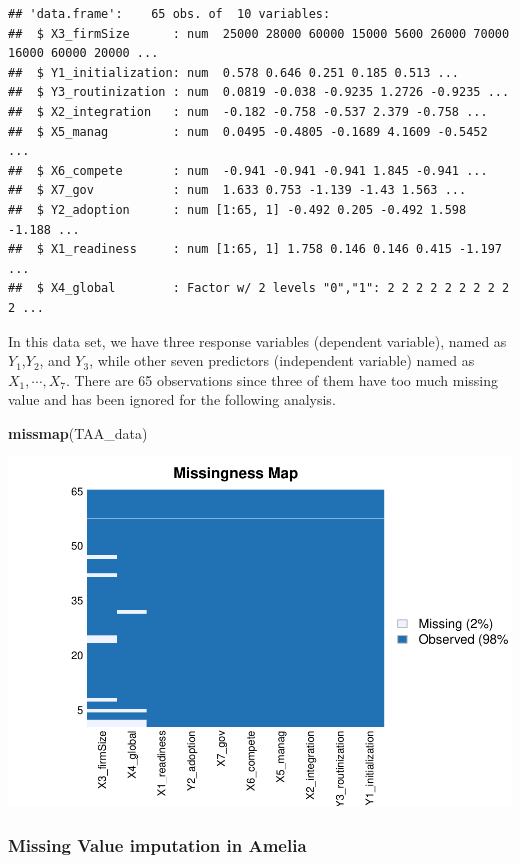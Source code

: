 \documentclass[
]{article}
\newenvironment{Shaded}{\begin{snugshade}}{\end{snugshade}}
\newcommand{\KeywordTok}[1]{\textcolor[rgb]{0.13,0.29,0.53}{\textbf{#1}}}
\newcommand{\NormalTok}[1]{#1}
\begin{document}
\begin{verbatim}
## 'data.frame':    65 obs. of  10 variables:
##  $ X3_firmSize      : num  25000 28000 60000 15000 5600 26000 70000 16000 60000 20000 ...
##  $ Y1_initialization: num  0.578 0.646 0.251 0.185 0.513 ...
##  $ Y3_routinization : num  0.0819 -0.038 -0.9235 1.2726 -0.9235 ...
##  $ X2_integration   : num  -0.182 -0.758 -0.537 2.379 -0.758 ...
##  $ X5_manag         : num  0.0495 -0.4805 -0.1689 4.1609 -0.5452 ...
##  $ X6_compete       : num  -0.941 -0.941 -0.941 1.845 -0.941 ...
##  $ X7_gov           : num  1.633 0.753 -1.139 -1.43 1.563 ...
##  $ Y2_adoption      : num [1:65, 1] -0.492 0.205 -0.492 1.598 -1.188 ...
##  $ X1_readiness     : num [1:65, 1] 1.758 0.146 0.146 0.415 -1.197 ...
##  $ X4_global        : Factor w/ 2 levels "0","1": 2 2 2 2 2 2 2 2 2 2 ...
\end{verbatim}

In this data set, we have three response variables (dependent variable),
named as \(Y_1\),\(Y_2\), and \(Y_3\), while other seven predictors
(independent variable) named as \(X_1, \cdots, X_7\). There are 65
observations since three of them have too much missing value and has
been ignored for the following analysis.

\begin{Shaded}
\begin{Highlighting}[]
\KeywordTok{missmap}\NormalTok{(TAA_data)}
\end{Highlighting}
\end{Shaded}

\includegraphics{markdown_report_files/figure-latex/unnamed-chunk-10-1.pdf}

\hypertarget{missing-value-imputation-in-amelia}{%
\subsubsection{Missing Value imputation in
Amelia}\label{missing-value-imputation-in-amelia}}
\end{document}
